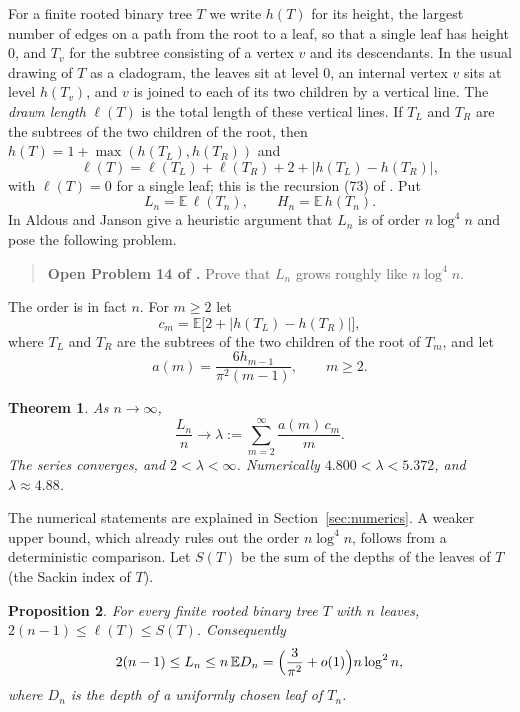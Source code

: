 \documentclass[11pt]{amsart}
\newtheorem{theorem}{Theorem}[section]
\newtheorem{proposition}[theorem]{Proposition}
\theoremstyle{remark}
\numberwithin{equation}{section}
\newcommand{\E}{\mathbb E}
\begin{document}
For a finite rooted binary tree $T$ we write $h(T)$ for its height, the largest number of edges on a path from the root to a leaf, so that a single leaf has height $0$, and $T_v$ for the subtree consisting of a vertex $v$ and its descendants. In the usual drawing of $T$ as a cladogram, the leaves sit at level $0$, an internal vertex $v$ sits at level $h(T_v)$, and $v$ is joined to each of its two children by a vertical line. The \emph{drawn length} $\ell(T)$ is the total length of these vertical lines. If $T_L$ and $T_R$ are the subtrees of the two children of the root, then $h(T)=1+\max(h(T_L),h(T_R))$ and
\begin{equation}\label{eq:drawn}
 \ell(T)=\ell(T_L)+\ell(T_R)+2+|h(T_L)-h(T_R)|,
\end{equation}
with $\ell(T)=0$ for a single leaf; this is the recursion (73) of \cite{AJ23}. Put
\[
 L_n=\E\,\ell(T_n),\qquad H_n=\E\,h(T_n).
\]
In \cite[Section 6.1.1]{AJ23} Aldous and Janson give a heuristic argument that $L_n$ is of order $n\log^4n$ and pose the following problem.

\begin{quote}
\textbf{Open Problem 14 of \cite{AJ23}.} Prove that $L_n$ grows roughly like $n\log^4n$.
\end{quote}

The order is in fact $n$. For $m\ge2$ let
\begin{equation}\label{eq:cm}
 c_m=\E\bigl[2+|h(T_L)-h(T_R)|\bigr],
\end{equation}
where $T_L$ and $T_R$ are the subtrees of the two children of the root of $T_m$, and let
\begin{equation}\label{eq:am}
 a(m)=\frac{6h_{m-1}}{\pi^2(m-1)},\qquad m\ge2.
\end{equation}

\begin{theorem}\label{thm:main}
As $n\to\infty$,
\[
 \frac{L_n}{n}\longrightarrow\lambda:=\sum_{m=2}^\infty\frac{a(m)\,c_m}{m}.
\]
The series converges, and $2<\lambda<\infty$. Numerically $4.800<\lambda<5.372$, and $\lambda\approx4.88$.
\end{theorem}

The numerical statements are explained in Section~\ref{sec:numerics}. A weaker upper bound, which already rules out the order $n\log^4n$, follows from a deterministic comparison. Let $S(T)$ be the sum of the depths of the leaves of $T$ (the Sackin index of $T$).

\begin{proposition}\label{prop:sackin}
For every finite rooted binary tree $T$ with $n$ leaves, $2(n-1)\le\ell(T)\le S(T)$. Consequently
\[
 2(n-1)\le L_n\le n\,\E D_n=\Bigl(\frac3{\pi^2}+o(1)\Bigr)n\log^2n,
\]
where $D_n$ is the depth of a uniformly chosen leaf of $T_n$.
\end{proposition}
\end{document}
